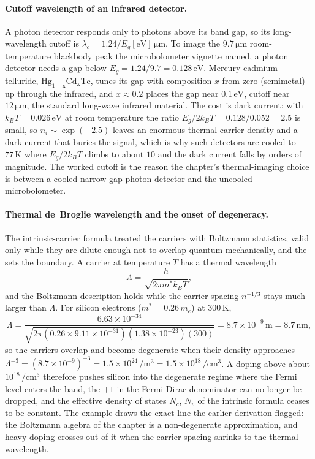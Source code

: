 \paragraph{Cutoff wavelength of an infrared detector.}
A photon detector responds only to photons above its band gap, so its long-
wavelength cutoff is $\lambda_c = 1.24/E_g[\si{\electronvolt}]\,\si{\micro
\meter}$. To image the $9.7\,\si{\micro\meter}$ room-temperature blackbody
peak the microbolometer vignette named, a photon detector needs a gap below
$E_g = 1.24/9.7 = 0.128\,\si{\electronvolt}$. Mercury-cadmium-telluride,
$\mathrm{Hg_{1-x}Cd_xTe}$, tunes its gap with composition $x$ from zero
(semimetal) up through the infrared, and $x \approx 0.2$ places the gap near
$0.1\,\si{\electronvolt}$, cutoff near $12\,\si{\micro\meter}$, the standard
long-wave infrared material. The cost is dark current: with $k_BT =
0.026\,\si{\electronvolt}$ at room temperature the ratio $E_g/2k_BT =
0.128/0.052 = 2.5$ is small, so $n_i \sim \exp(-2.5)$ leaves an enormous
thermal-carrier density and a dark current that buries the signal, which is
why such detectors are cooled to $77\,\si{\kelvin}$ where $E_g/2k_BT$ climbs
to about $10$ and the dark current falls by orders of magnitude. The
worked cutoff is the reason the chapter's thermal-imaging choice is between
a cooled narrow-gap photon detector and the uncooled microbolometer.

\paragraph{Thermal de~Broglie wavelength and the onset of degeneracy.}
The intrinsic-carrier formula treated the carriers with Boltzmann
statistics, valid only while they are dilute enough not to overlap
quantum-mechanically, and the  sets
the boundary. A carrier at temperature $T$ has a thermal wavelength
\[
\Lambda = \frac{h}{\sqrt{2\pi m^{*}k_BT}},
\]
and the Boltzmann description holds while the carrier spacing $n^{-1/3}$
stays much larger than $\Lambda$. For silicon electrons ($m^{*} =
0.26\,m_e$) at $300\,\si{\kelvin}$,
\[
\Lambda = \frac{6.63\times 10^{-34}}
               {\sqrt{2\pi(0.26\times 9.11\times 10^{-31})(1.38\times
                10^{-23})(300)}}
        = 8.7\times 10^{-9}\,\si{\meter} = 8.7\,\si{\nano\meter},
\]
so the carriers overlap and become degenerate when their density approaches
$\Lambda^{-3} = (8.7\times 10^{-9})^{-3} = 1.5\times 10^{24}\,\si{\per\meter
\cubed} = 1.5\times 10^{18}\,\si{\per\centi\meter\cubed}$. A doping above
about $10^{18}\,\si{\per\centi\meter\cubed} $ therefore pushes silicon into
the degenerate regime where the Fermi level enters the band, the $+1$ in the
Fermi-Dirac denominator can no longer be dropped, and the effective density
of states $N_c$, $N_v$ of the intrinsic formula ceases to be constant. The
example draws the exact line the earlier derivation flagged: the Boltzmann
algebra of the chapter is a non-degenerate approximation, and heavy doping
crosses out of it when the carrier spacing shrinks to the thermal
wavelength.

